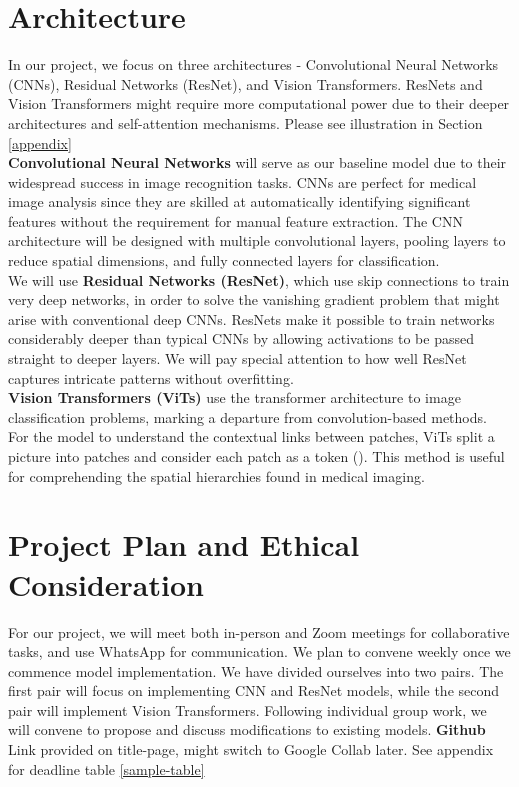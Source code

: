 \documentclass{article}
\begin{document}
\section{Architecture}
In our project, we focus on three architectures - Convolutional Neural Networks (CNNs), Residual Networks (ResNet), and Vision Transformers. ResNets and Vision Transformers might require more computational power due to their deeper architectures and self-attention mechanisms. Please see illustration in  Section \ref{appendix} \\
 \textbf{Convolutional Neural Networks} will serve as our baseline model due to their widespread success in image recognition tasks. CNNs are perfect for medical image analysis since they are skilled at automatically identifying significant features without the requirement for manual feature extraction. The CNN architecture will be designed with multiple convolutional layers, pooling layers to reduce spatial dimensions, and fully connected layers for classification. \\
We will use \textbf{Residual Networks (ResNet)}, which use skip connections to train very deep networks, in order to solve the vanishing gradient problem that might arise with conventional deep CNNs. ResNets make it possible to train networks considerably deeper than typical CNNs by allowing activations to be passed straight to deeper layers. We will pay special attention to how well ResNet captures intricate patterns without overfitting. \\
\textbf{Vision Transformers (ViTs)} use the transformer architecture to image classification problems, marking a departure from convolution-based methods. For the model to understand the contextual links between patches, ViTs split a picture into patches and consider each patch as a token (\citet{MANZARI2023106791}). This method is useful for comprehending the spatial hierarchies found in medical imaging. 
\section{Project Plan and Ethical Consideration}

For our project, we will meet both in-person and Zoom meetings for collaborative tasks, and use WhatsApp for communication. We plan to convene weekly once we commence model implementation. We have divided ourselves into two pairs. The first pair will focus on implementing CNN and ResNet models, while the second pair will implement Vision Transformers. Following individual group work, we will convene to propose and discuss modifications to existing models. \textbf{Github} Link provided on title-page, might switch to Google Collab later. See appendix for deadline table \ref{sample-table}
\end{document}
